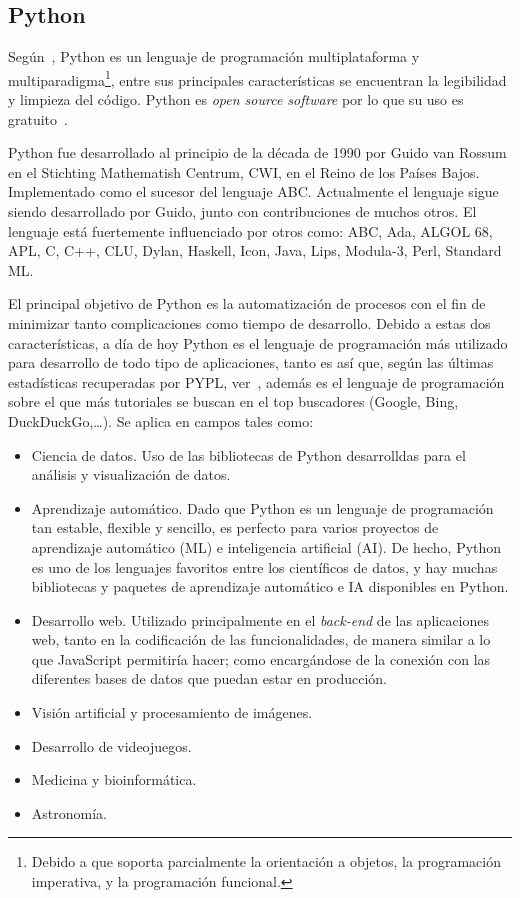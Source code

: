 \subsection{Python}
Según~\cite{queespython}, Python es un lenguaje de programación multiplataforma y multiparadigma\footnote{Debido a que soporta parcialmente la orientación a objetos, la programación imperativa, y la programación funcional.}, entre sus principales características se encuentran la legibilidad y limpieza del código. Python es \textit{open source software} por lo que su uso es gratuito~\cite{pythonLICENSE}.

Python fue desarrollado al principio de la década de 1990 por Guido van Rossum en el Stichting Mathematish Centrum, CWI, en el Reino de los Países Bajos. Implementado como el sucesor del lenguaje ABC. Actualmente el lenguaje sigue siendo desarrollado por Guido, junto con contribuciones de muchos otros. El lenguaje está fuertemente influenciado por otros como: ABC, Ada, ALGOL 68, APL, C, C++, CLU, Dylan, Haskell, Icon, Java, Lips, Modula-3, Perl, Standard ML.

El principal objetivo de Python es la automatización de procesos con el fin de minimizar tanto complicaciones como tiempo de desarrollo. Debido a estas dos características, a día de hoy Python es el lenguaje de programación más utilizado para desarrollo de todo tipo de aplicaciones, tanto es así que, según las últimas estadísticas recuperadas por PYPL, ver~\cite{pyplindex}, además es el lenguaje de programación sobre el que más tutoriales se buscan en el top buscadores (Google, Bing, DuckDuckGo,\dots). Se aplica en campos tales como:
\begin{itemize}
\item Ciencia de datos. Uso de las bibliotecas de Python desarrolldas para el análisis y visualización de datos.
\item Aprendizaje automático. Dado que Python es un lenguaje de programación tan estable, flexible y sencillo, es perfecto para varios proyectos de aprendizaje automático (ML) e inteligencia artificial (AI). De hecho, Python es uno de los lenguajes favoritos entre los científicos de datos, y hay muchas bibliotecas y paquetes de aprendizaje automático e IA disponibles en Python. 
\item Desarrollo web. Utilizado principalmente en el \textit{back-end} de las aplicaciones web, tanto en la codificación de las funcionalidades, de manera similar a lo que JavaScript permitiría hacer; como encargándose de la conexión con las diferentes bases de datos que puedan estar en producción.
\item Visión artificial y procesamiento de imágenes. 
\item Desarrollo de videojuegos.
\item Medicina y bioinformática.
\item Astronomía.
\end{itemize}

